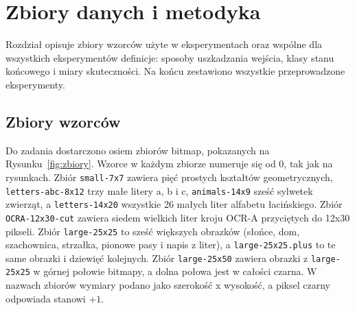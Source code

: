 \section{Zbiory danych i metodyka}
\label{sec:metodyka}

Rozdział opisuje zbiory wzorców użyte w eksperymentach oraz wspólne dla wszystkich eksperymentów definicje: sposoby uszkadzania wejścia, klasy stanu końcowego i miary skuteczności. Na końcu zestawiono wszystkie przeprowadzone eksperymenty.

\subsection{Zbiory wzorców}
\label{sec:zbiory}

Do zadania dostarczono osiem zbiorów bitmap, pokazanych na Rysunku~\ref{fig:zbiory}. Wzorce w każdym zbiorze numeruje się od 0, tak jak na rysunkach. Zbiór \mbox{\texttt{small-7x7}} zawiera pięć prostych kształtów geometrycznych, \mbox{\texttt{letters-abc-8x12}} trzy małe litery a, b i c, \mbox{\texttt{animals-14x9}} sześć sylwetek zwierząt, a \mbox{\texttt{letters-14x20}} wszystkie 26 małych liter alfabetu łacińskiego. Zbiór \mbox{\texttt{OCRA-12x30-cut}} zawiera siedem wielkich liter kroju OCR-A przyciętych do \mbox{12x30} pikseli. Zbiór \mbox{\texttt{large-25x25}} to sześć większych obrazków (słońce, dom, szachownica, strzałka, pionowe pasy i napis z liter), a \mbox{\texttt{large-25x25.plus}} to te same obrazki i dziewięć kolejnych. Zbiór \mbox{\texttt{large-25x50}} zawiera obrazki z \mbox{\texttt{large-25x25}} w górnej połowie bitmapy, a dolna połowa jest w całości czarna. W nazwach zbiorów wymiary podano jako szerokość x wysokość, a piksel czarny odpowiada stanowi $+1$.

